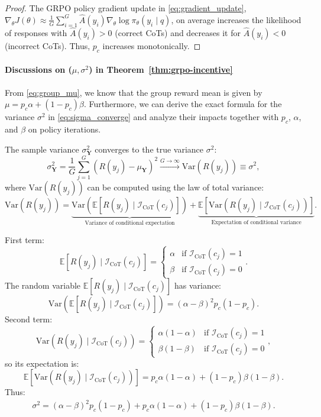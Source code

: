 \begin{proof}
The GRPO policy gradient update in \eqref{eq:gradient_update},
$\nabla_\theta J(\theta) \approx \frac{1}{G} \sum_{i=1}^G \hat{A}(y_i) \nabla_\theta \log \pi_\theta(y_i \mid q)$,
on average increases the likelihood of responses with $\hat{A}(y_i) > 0$ (correct CoTs) and decreases it for $\hat{A}(y_i) < 0$ (incorrect CoTs).
Thus, $p_c$ increases monotonically.
\end{proof}

\paragraph{Discussions on ($\mu, \sigma^2$) in Theorem~\ref{thm:grpo-incentive}}
From \eqref{eq:group_mu}, we know that the group reward mean is given by $\mu = p_c \alpha + (1 - p_c)\beta$. Furthermore, we can derive the exact formula for the variance $\sigma^2$ in \eqref{eq:sigma_converge} and analyze their impacts together with $p_c$, $\alpha$, and $\beta$ on policy iterations.

The sample variance $\sigma_{\mathbf{Y}}^2$ converges to the true variance $\sigma^2$:
\[
\sigma_{\mathbf{Y}}^2 = \frac{1}{G} \sum_{j=1}^G (R(y_j) - \mu_{\mathbf{Y}})^2 \xrightarrow{G \to \infty} \text{Var}(R(y_j)) \equiv \sigma^2,
\]
where $\text{Var}(R(y_j))$ can be computed using the law of total variance:
\[
\text{Var}(R(y_j)) = \underbrace{\text{Var}(\mathbb{E}[R(y_j) \mid \mathcal{I}_{\text{CoT}}(c_j)])}_{\text{Variance of conditional expectation}} + \underbrace{\mathbb{E}[\text{Var}(R(y_j) \mid \mathcal{I}_{\text{CoT}}(c_j))]}_{\text{Expectation of conditional variance}}.
\]

First term:
    \[
    \mathbb{E}[R(y_j) \mid \mathcal{I}_{\text{CoT}}(c_j)] = 
    \begin{cases} 
    \alpha & \text{if } \mathcal{I}_{\text{CoT}}(c_j) = 1 \\
    \beta & \text{if } \mathcal{I}_{\text{CoT}}(c_j) = 0
    \end{cases}.
    \]
The random variable $\mathbb{E}[R(y_j) \mid \mathcal{I}_{\text{CoT}}(c_j)]$ has variance:
  \[
  \text{Var}(\mathbb{E}[R(y_j) \mid \mathcal{I}_{\text{CoT}}(c_j)]) = (\alpha - \beta)^2 p_c (1 - p_c).
  \]
Second term:
  \[
  \text{Var}(R(y_j) \mid \mathcal{I}_{\text{CoT}}(c_j)) = 
  \begin{cases} 
  \alpha(1 - \alpha) & \text{if } \mathcal{I}_{\text{CoT}}(c_j) = 1 \\
  \beta(1 - \beta) & \text{if } \mathcal{I}_{\text{CoT}}(c_j) = 0
  \end{cases},
  \]
so its expectation is:
  \[
  \mathbb{E}[\text{Var}(R(y_j) \mid \mathcal{I}_{\text{CoT}}(c_j))] = p_c \alpha(1 - \alpha) + (1 - p_c)\beta(1 - \beta).
  \]
Thus:
\begin{align}
\sigma^2 = (\alpha - \beta)^2 p_c (1 - p_c) + p_c \alpha(1 - \alpha) + (1 - p_c)\beta(1 - \beta).
\end{align}

